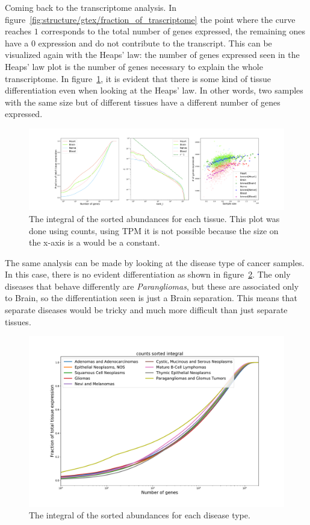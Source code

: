 Coming back to the transcriptome analysis. In figure~\ref{fig:structure/gtex/fraction_of_trascriptome} the point where the curve reaches $1$ corresponds to the total number of genes expressed, the remaining ones have a $0$ expression and do not contribute to the transcript. This can be visualized again with the Heaps' law: the number of genes expressed seen in the Heaps' law plot is the number of genes necessary to explain the whole transcriptome. In figure~\ref{fig:structure/gtex/heaps_tissue}, it is evident that there is some kind of tissue differentiation even when looking at the Heaps' law. In other words, two samples with the same size but of different tissues have a different number of genes expressed.
\begin{figure}[htb!]
  \centering
  \includegraphics[width=0.5\linewidth]{pictures/structure/gtex/heaps_tissue.pdf}
  \caption{The integral of the sorted abundances for each tissue. This plot was done using counts, using TPM it is not possible because the size on the x-axis is a would be a constant.}
  \label{fig:structure/gtex/heaps_tissue}
\end{figure}
The same analysis can be made by looking at the disease type of cancer samples. In this case, there is no evident differentiation as shown in figure~\ref{fig:structure/tcga/fraction_of_trascriptome_disease}. The only diseases that behave differently are \textit{Parangliomas}, but these are associated only to Brain, so the differentiation seen is just a Brain separation. This means that separate diseases would be tricky and much more difficult than just separate tissues.
\begin{figure}[htb!]
  \centering
  \includegraphics[width=0.8\linewidth]{pictures/structure/tcga/fraction_of_trascriptome_disease.pdf}
  \caption{The integral of the sorted abundances for each disease type.}
  \label{fig:structure/tcga/fraction_of_trascriptome_disease}
\end{figure}

